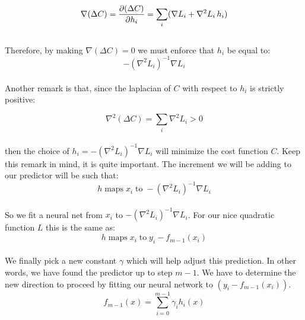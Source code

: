 \begin{equation*}
\nabla(\Delta C)=\frac{\partial (\Delta C)}{\partial h_i}=\sum_{i}(\nabla L_i+\nabla^2 L_i\,h_i)\\
\end{equation*}\\

Therefore, by making $\nabla(\Delta C)=0$ we must enforce that $h_i$ be equal to:\\

\begin{equation*}
-(\nabla^2L_i)^{-1}\nabla L_i
\end{equation*}\\

Another remark is that, since the laplacian of $C$ with respect to $h_i$ is strictly positive:

\begin{equation*}
\nabla^2(\Delta C)=\sum_{i}\nabla^2L_i>0
\end{equation*}\\

\noindent then the choice of $h_i=-(\nabla^2L_i)^{-1}\nabla L_i$ will minimize the cost function $C$. Keep this remark in mind, it is quite important. The increment we will be adding to our predictor will be such that:\\

\begin{equation*}
h\;\text{maps}\;x_i\;\text{to}\;-(\nabla^2L_i)^{-1}\nabla L_i
\end{equation*}\\

So we fit a neural net from $x_i$ to $-(\nabla^2L_i)^{-1}\nabla L_i$. For our nice quadratic function $L$ this is the same as:\\

\begin{equation*}
h\;\text{maps}\;x_i\;\text{to}\;y_i-f_{m-1}(x_i)
\end{equation*}\\

We finally pick a new constant $\gamma$ which will help adjust this prediction. In other words, we have found the predictor up to step $m-1$. We have to determine the new direction to proceed by fitting our neural network to $(y_i-f_{m-1}(x_i))$.\\

\begin{equation*}
f_{m-1}(x)=\sum_{i=0}^{m-1}\gamma_ih_i(x)
\end{equation*}\\

